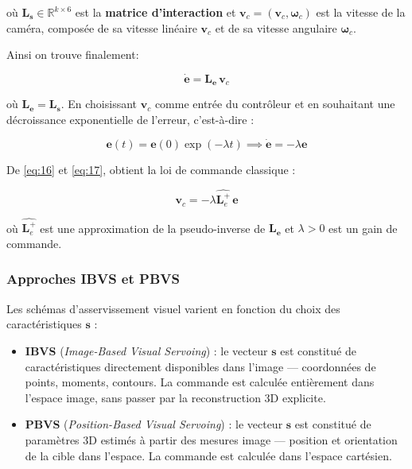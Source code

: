 où $\mathbf{L_s} \in \mathbb{R}^{k \times 6}$ est la \textbf{matrice 
d'interaction}  et 
$\mathbf{v}_c = (\mathbf{v}_c, \boldsymbol{\omega}_c)$ est la vitesse  de la caméra, composée de sa vitesse linéaire $\mathbf{v}_c$ 
et de sa vitesse angulaire $\boldsymbol{\omega}_c$.

Ainsi on trouve finalement: 

\begin{equation}
    \dot{\mathbf{e}} = \mathbf{L_e} \, \mathbf{v}_c
    \label{eq:16}
\end{equation}

où $\mathbf{L_e} = \mathbf{L_s}$. En choisissant $\mathbf{v}_c$ comme 
entrée du contrôleur et en souhaitant une décroissance exponentielle de 
l'erreur, c'est-à-dire :

\begin{equation}
    \mathbf{e}(t) = \mathbf{e}(0)\exp({-\lambda t}) \implies \dot{\mathbf{e}} = -\lambda \mathbf{e}
    \label{eq:17}
\end{equation}


De \eqref{eq:16} et \eqref{eq:17}, obtient la loi de commande classique :

\begin{equation}
    \mathbf{v}_c = -\lambda \widehat{\mathbf{L}_e^+} \, \mathbf{e}
    \label{eq:loi_commande}
\end{equation}

où $\widehat{\mathbf{L}_e^+}$ est une approximation de la pseudo-inverse 
de $\mathbf{L_e}$ et $\lambda > 0$ est un gain de commande.

\subsubsection{Approches IBVS et PBVS}

Les schémas d'asservissement visuel varient en fonction du choix des caractéristiques $\mathbf{s}$ \cite{ref6} :

\begin{itemize}[noitemsep, topsep=4pt]
    \item \textbf{IBVS} (\textit{Image-Based Visual Servoing}) : le vecteur $\mathbf{s}$ est constitué de caractéristiques directement disponibles dans l'image — coordonnées de points, moments, contours. La commande est calculée entièrement dans l'espace image, sans passer par la reconstruction 3D explicite.
    
    \item \textbf{PBVS} (\textit{Position-Based Visual Servoing}) : le vecteur $\mathbf{s}$ est constitué de paramètres 3D estimés à partir des mesures image — position et orientation de la cible dans l'espace. La commande est calculée dans l'espace cartésien.
\end{itemize}

